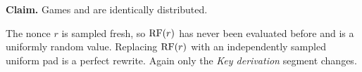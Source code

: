 \textbf{Claim.}
  Games  and  are identically
  distributed.

The nonce $r$ is sampled fresh, so $\mathrm{RF}(r)$ has never been evaluated before and
is a uniformly random value. Replacing $\mathrm{RF}(r)$ with an independently sampled
uniform pad is a perfect rewrite. Again only the \emph{Key derivation} segment
changes.
